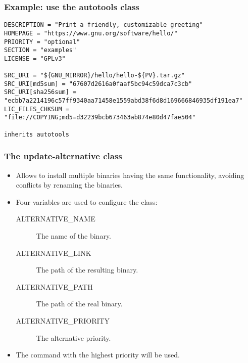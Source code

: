 \begin{frame}[fragile]
  \frametitle{Example: use the autotools class}
  \begin{block}{}
    \begin{verbatim}
DESCRIPTION = "Print a friendly, customizable greeting"
HOMEPAGE = "https://www.gnu.org/software/hello/"
PRIORITY = "optional"
SECTION = "examples"
LICENSE = "GPLv3"

SRC_URI = "${GNU_MIRROR}/hello/hello-${PV}.tar.gz"
SRC_URI[md5sum] = "67607d2616a0faaf5bc94c59dca7c3cb"
SRC_URI[sha256sum] = "ecbb7a2214196c57ff9340aa71458e1559abd38f6d8d169666846935df191ea7"
LIC_FILES_CHKSUM = "file://COPYING;md5=d32239bcb673463ab874e80d47fae504"

inherits autotools
    \end{verbatim}
  \end{block}
\end{frame}

\begin{frame}
  \frametitle{The update-alternative class}
  \begin{itemize}
    \item Allows to install multiple binaries having the same
          functionality, avoiding conflicts by renaming the binaries.
    \item Four variables are used to configure the class:
    \begin{description}
      \item[ALTERNATIVE\_NAME] The name of the binary.
      \item[ALTERNATIVE\_LINK] The path of the resulting binary.
      \item[ALTERNATIVE\_PATH] The path of the real binary.
      \item[ALTERNATIVE\_PRIORITY] The alternative priority.
    \end{description}
    \item The command with the highest priority will be used.
  \end{itemize}
\end{frame}

